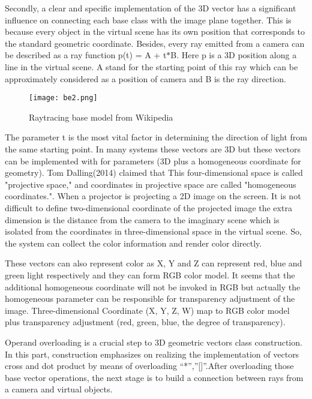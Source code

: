 \documentclass[11pt]{article}
\begin{document}
Secondly, a clear and specific implementation of the 3D vector has a significant influence on connecting each base class with the image plane together. This is because every object in the virtual scene has its own position that corresponds to the standard geometric coordinate. Besides, every ray emitted from a camera can be described as a ray function p(t) = A + t{$*$}B.
Here p is a 3D position along a line in the virtual scene. A stand for the starting point of this ray which can be approximately considered as a position of camera and B is the ray direction. 

\begin{figure}[H]

\centering
\texttt{[image: be2.png]}
\caption{Raytracing base model from Wikipedia}
\label{fig:label}
\end{figure}

The parameter t is the most vital factor in determining the direction of light from the same starting point. In many systems these vectors are 3D but these vectors can be implemented with for parameters (3D plus a homogeneous coordinate for geometry). Tom Dalling(2014) claimed that This four-dimensional space is called "projective space," and coordinates in projective space are called "homogeneous coordinates.". When a projector is projecting a 2D image on the screen. It is not difficult to define two-dimensional coordinate of the projected image the extra dimension is the distance from the camera to the imaginary scene which is isolated from the coordinates in three-dimensional space in the virtual scene. So, the system can collect the color information and render color directly. 

These vectors can also represent color as X, Y and Z can represent red, blue and green light respectively and they can form RGB color model. It seems that the additional homogeneous coordinate will not be invoked in RGB but actually the homogeneous parameter can be responsible for transparency adjustment of the image. Three-dimensional Coordinate (X, Y, Z, W) map to RGB color model plus transparency adjustment (red, green, blue, the degree of transparency).

Operand overloading is a crucial step to 3D geometric vectors class construction. In this part, construction emphasizes on realizing the implementation of vectors cross and dot product by means of overloading “*”,”[]”.After overloading those base vector operations, the next stage is to build a connection between rays from a camera and virtual objects.
\end{document}
